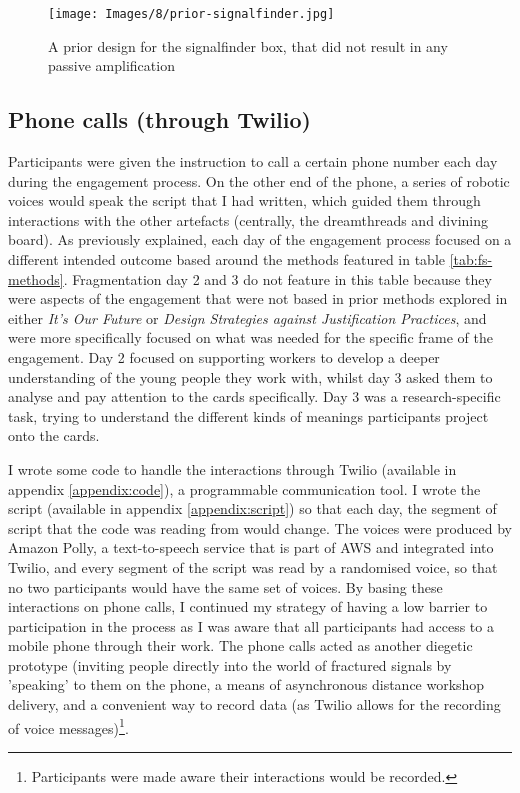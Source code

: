 \begin{figure}
    \centering
    \texttt{[image: Images/8/prior-signalfinder.jpg]}
    \caption{A prior design for the signalfinder box, that did not result in any passive amplification}
    \label{fig:prior-box}
\end{figure}


\subsection{Phone calls (through Twilio)}

Participants were given the instruction to call a certain phone number each day during the engagement process. On the other end of the phone, a series of robotic voices would speak the script that I had written, which guided them through interactions with the other artefacts (centrally, the dreamthreads and divining board). As previously explained, each day of the engagement process focused on a different intended outcome based around the methods featured in table \ref{tab:fs-methods}. Fragmentation day 2 and 3 do not feature in this table because they were aspects of the engagement that were not based in prior methods explored in either \textit{It's Our Future} or \textit{Design Strategies against Justification Practices}, and were more specifically focused on what was needed for the specific frame of the engagement. Day 2 focused on supporting workers to develop a deeper understanding of the young people they work with, whilst day 3 asked them to analyse and pay attention to the cards specifically. Day 3 was a research-specific task, trying to understand the different kinds of meanings participants project onto the cards.  

I wrote some code to handle the interactions through Twilio (available in appendix \ref{appendix:code}), a programmable communication tool. I wrote the script (available in appendix \ref{appendix:script}) so that each day, the segment of script that the code was reading from would change. The voices were produced by Amazon Polly, a text-to-speech service that is part of AWS and integrated into Twilio, and every segment of the script was read by a randomised voice, so that no two participants would have the same set of voices. By basing these interactions on phone calls, I continued my strategy of having a low barrier to participation in the process as I was aware that all participants had access to a mobile phone through their work. The phone calls acted as another diegetic prototype (inviting people directly into the world of fractured signals by 'speaking' to them on the phone, a means of asynchronous distance workshop delivery, and a convenient way to record data (as Twilio allows for the recording of voice messages)\footnote{Participants were made aware their interactions would be recorded.}.

